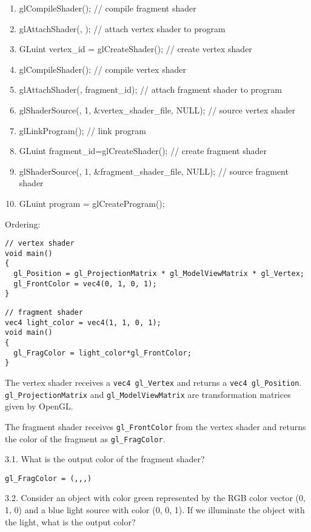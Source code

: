 \documentclass[12pt]{article}
\newcommand{\TODOL}[1]{\textcolor{red}{\underline{\hspace{#1 cm}}}}
\begin{document}
\begin{enumerate}[label=\Alph*.]
\item glCompileShader(\TODOL2); // compile fragment shader
\item glAttachShader(\TODOL2, \TODOL2); // attach vertex shader to program
\item GLuint vertex\_id = glCreateShader(\TODOL2); // create vertex shader
\item glCompileShader(\TODOL2); // compile vertex shader
\item glAttachShader(\TODOL2, fragment\_id); // attach fragment shader to program
\item glShaderSource(\TODOL2, 1, \&vertex\_shader\_file, NULL); // source vertex shader
\item glLinkProgram(\TODOL2); // link program
\item GLuint fragment\_id=glCreateShader(\TODOL2); // create fragment shader
\item glShaderSource(\TODOL2, 1, \&fragment\_shader\_file, NULL); // source fragment shader
\item GLuint program = glCreateProgram();
\end{enumerate}
Ordering:\TODOL6
\begin{lstlisting}
// vertex shader
void main()
{
  gl_Position = gl_ProjectionMatrix * gl_ModelViewMatrix * gl_Vertex;
  gl_FrontColor = vec4(0, 1, 0, 1);
}
\end{lstlisting}

\begin{lstlisting}
// fragment shader
vec4 light_color = vec4(1, 1, 0, 1);
void main()
{
  gl_FragColor = light_color*gl_FrontColor;
}
\end{lstlisting}

The vertex shader receives a \texttt{vec4 gl\_Vertex} and returns a
\texttt{vec4 gl\_Position}. \texttt{gl\_ProjectionMatrix} and
\texttt{gl\_ModelViewMatrix} are transformation matrices given by OpenGL.

The fragment shader receives \texttt{gl\_FrontColor} from the vertex shader and
returns the color of the fragment as \texttt{gl\_FragColor}.

3.1. What is the output color of the fragment shader?

\texttt{gl\_FragColor = (\TODOL1,\TODOL1,\TODOL1,\TODOL1)}

3.2. Consider an object with color green represented by the RGB color vector (0,
1, 0) and a blue light source with color (0, 0, 1). If we illuminate the object
with the light, what is the output color?
\end{document}
